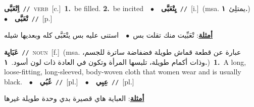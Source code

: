 \documentclass[10pt,a4paper,twoside]{article} %
\begin{document}
\begin{multicols}{2}
{{{{{{{{{{\setlength\topsep{0pt}\textbf{\foreignlanguage{arabic}{اِتْعَبَّى}}\ {\color{gray}\texttt{//}\color{black}}\ \textsc{verb}\ [c.]\ \textbf{1.}~be filled.  \textbf{2.}~be incited\ \ $\bullet$\ \ \setlength\topsep{0pt}\textbf{\foreignlanguage{arabic}{يِتْعَبَّى}}\ {\color{gray}\texttt{//}\color{black}}\ [i.]\ \color{gray}(msa. \foreignlanguage{arabic}{يمتلِئ}~\foreignlanguage{arabic}{\textbf{١.}})\color{black}\ \ $\bullet$\ \ \setlength\topsep{0pt}\textbf{\foreignlanguage{arabic}{تْعَبَّى}}\ {\color{gray}\texttt{//}\color{black}}\ [p.]\  \begin{flushright}\color{gray}\foreignlanguage{arabic}{\textbf{\underline{\foreignlanguage{arabic}{أمثلة}}}: تْعَبِّيت منك تقلت بس\ $\bullet$\ \  استنى عليه بس يتْعَبَّى كله وبعديها شيله}\end{flushright}\color{black}} \vspace{2mm}

{\setlength\topsep{0pt}\textbf{\foreignlanguage{arabic}{عَبَايِة}}\ {\color{gray}\texttt{//}\color{black}}\ \textsc{noun}\ [f.]\ \color{gray}(msa. \foreignlanguage{arabic}{عبارة عن قطعة قماش طويلة فضفاضة ساترة للجسم، وذات أكمام طويلة، تلبسها المرأة وتكون في العادة ذات لون أسود.}~\foreignlanguage{arabic}{\textbf{١.}})\color{black}\ \textbf{1.}~A long, loose-fitting, long-sleeved, body-woven cloth that women wear and is usually black.\ \ $\bullet$\ \ \setlength\topsep{0pt}\textbf{\foreignlanguage{arabic}{عُبُي}}\ {\color{gray}\texttt{//}\color{black}}\ [pl.]\ \ $\bullet$\ \ \setlength\topsep{0pt}\textbf{\foreignlanguage{arabic}{عِبِي}}\ {\color{gray}\texttt{//}\color{black}}\ [pl.]\  \begin{flushright}\color{gray}\foreignlanguage{arabic}{\textbf{\underline{\foreignlanguage{arabic}{أمثلة}}}: العباية هاي قصيرة بدي وحدة طويلة غيرها}\end{flushright}\color{black}} \vspace{2mm}

}}}}}}}}}
\end{multicols}
\end{document}
